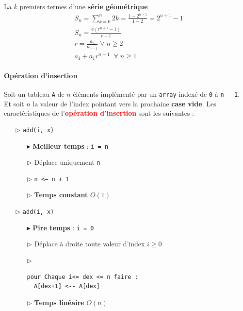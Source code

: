 \documentclass{report}
\begin{document}
\begin{multicols*}{3}
  \noindent
  La $k$ premiers termes d'une \textbf{série géométrique} 
  \begin{align*}
        & S_n = \sum_{k=0}^{n } 2k = \frac{1 - 2^{n+1}}{1 - 2} = 2^{n+1} -1 \\ 
        & S_n =  \frac{a(r^{n+1} - 1)}{r - 1} \\ 
        & r = \frac{a_n}{a_{n-1}} \; \forall \; n \geq 2 \\ 
        & a_1 + a_1r^{n-1} \;\; \forall \; n \geq 1 
  \end{align*}


  \paragraph{Opération d'insertion}
  Soit un tableau \texttt{A} de $n$ éléments implémenté 
  par un \texttt{array} indexé de \texttt{0} 
  à \texttt{n - 1}. Et soit $n$ la valeur 
  de l'index pointant vers la prochaine \textbf{case vide}. 
  Les caractéristiques de l'\textcolor{red}{\textbf{opération d'insertion}} 
  sont les suivantes :

  \begin{itemize}
    \item [$\rhd$ ] \texttt{add(i, \textcolor{myb}{x})}  
      \begin{itemize}
        \item [$\blacktriangleright$ ] \textbf{Meilleur temps} : 
          \texttt{i = n} 
        \item [$\rhd$ ] Déplace uniquement \texttt{n}  
        \item [$\rhd$ ] \texttt{n <--- n + 1}     
        \item [$\rhd$ ] \textbf{Temps constant} $O(1)$  
      \end{itemize}
  \end{itemize}


  \begin{itemize}
    \item [$\rhd$ ] \texttt{add(i, \textcolor{myb}{x})}  
      \begin{itemize}
        \item [$\blacktriangleright$ ] \textbf{Pire temps} : 
          \texttt{i = 0} 
        \item [$\rhd$ ] Déplace à droite toute valeur d'index $i \geq 0$     
        \item [$\rhd$ ] 
          \begin{lstlisting}
pour Chaque i<= dex <= n faire :
  A[dex+1] <-- A[dex]             
          \end{lstlisting}
        \item [$\rhd$ ] \textbf{Temps linéaire} $O(n)$  
      \end{itemize}
  \end{itemize}


\end{multicols*}
\end{document}
